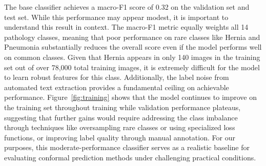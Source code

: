 The base classifier achieves a macro-F1 score of 0.32 on the validation set and test set.
While this performance may appear modest, it is important to understand this result in context.
The macro-F1 metric equally weights all 14 pathology classes, meaning that poor performance on rare classes like Hernia and Pneumonia substantially reduces the overall score even if the model performs well on common classes.
Given that Hernia appears in only 140 images in the training set out of over 78,000 total training images, it is extremely difficult for the model to learn robust features for this class.
Additionally, the label noise from automated text extraction provides a fundamental ceiling on achievable performance.
Figure~\ref{fig:training} shows that the model continues to improve on the training set throughout training while validation performance plateaus, suggesting that further gains would require addressing the class imbalance through techniques like oversampling rare classes or using specialized loss functions, or improving label quality through manual annotation.
For our purposes, this moderate-performance classifier serves as a realistic baseline for evaluating conformal prediction methods under challenging practical conditions.
